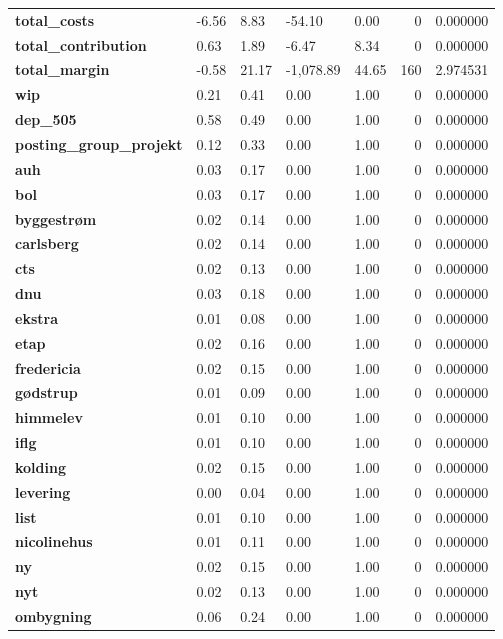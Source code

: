 \begin{landscape}
\begin{longtable}{lllllrr}
\textbf{total\_costs} & -6.56 & 8.83 & -54.10 & 0.00 & 0 & 0.000000 \\
\textbf{total\_contribution} & 0.63 & 1.89 & -6.47 & 8.34 & 0 & 0.000000 \\
\textbf{total\_margin} & -0.58 & 21.17 & -1,078.89 & 44.65 & 160 & 2.974531 \\
\textbf{wip} & 0.21 & 0.41 & 0.00 & 1.00 & 0 & 0.000000 \\
\textbf{dep\_505} & 0.58 & 0.49 & 0.00 & 1.00 & 0 & 0.000000 \\
\textbf{posting\_group\_projekt} & 0.12 & 0.33 & 0.00 & 1.00 & 0 & 0.000000 \\
\textbf{auh} & 0.03 & 0.17 & 0.00 & 1.00 & 0 & 0.000000 \\
\textbf{bol} & 0.03 & 0.17 & 0.00 & 1.00 & 0 & 0.000000 \\
\textbf{byggestrøm} & 0.02 & 0.14 & 0.00 & 1.00 & 0 & 0.000000 \\
\textbf{carlsberg} & 0.02 & 0.14 & 0.00 & 1.00 & 0 & 0.000000 \\
\textbf{cts} & 0.02 & 0.13 & 0.00 & 1.00 & 0 & 0.000000 \\
\textbf{dnu} & 0.03 & 0.18 & 0.00 & 1.00 & 0 & 0.000000 \\
\textbf{ekstra} & 0.01 & 0.08 & 0.00 & 1.00 & 0 & 0.000000 \\
\textbf{etap} & 0.02 & 0.16 & 0.00 & 1.00 & 0 & 0.000000 \\
\textbf{fredericia} & 0.02 & 0.15 & 0.00 & 1.00 & 0 & 0.000000 \\
\textbf{gødstrup} & 0.01 & 0.09 & 0.00 & 1.00 & 0 & 0.000000 \\
\textbf{himmelev} & 0.01 & 0.10 & 0.00 & 1.00 & 0 & 0.000000 \\
\textbf{iflg} & 0.01 & 0.10 & 0.00 & 1.00 & 0 & 0.000000 \\
\textbf{kolding} & 0.02 & 0.15 & 0.00 & 1.00 & 0 & 0.000000 \\
\textbf{levering} & 0.00 & 0.04 & 0.00 & 1.00 & 0 & 0.000000 \\
\textbf{list} & 0.01 & 0.10 & 0.00 & 1.00 & 0 & 0.000000 \\
\textbf{nicolinehus} & 0.01 & 0.11 & 0.00 & 1.00 & 0 & 0.000000 \\
\textbf{ny} & 0.02 & 0.15 & 0.00 & 1.00 & 0 & 0.000000 \\
\textbf{nyt} & 0.02 & 0.13 & 0.00 & 1.00 & 0 & 0.000000 \\
\textbf{ombygning} & 0.06 & 0.24 & 0.00 & 1.00 & 0 & 0.000000 \\

\end{longtable}
\end{landscape}
